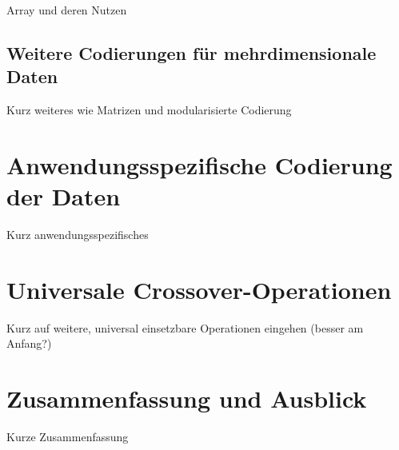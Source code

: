 \documentclass{llncs}
\begin{document}
		Array und deren Nutzen
	
	\subsection{Weitere Codierungen für mehrdimensionale Daten}
	\label{sec:WeitereMehrdimensionale}
	
		Kurz weiteres wie Matrizen und modularisierte Codierung

\section{Anwendungsspezifische Codierung der Daten}
\label{sec:AnwendungsspezifischeCod}

	Kurz anwendungsspezifisches

\section{Universale Crossover-Operationen}
\label{sec:UniversaleOp}

	Kurz auf weitere, universal einsetzbare Operationen eingehen (besser am Anfang?)

\section{Zusammenfassung und Ausblick}
\label{sec:Zusammenfassung}

	Kurze Zusammenfassung

 






\newpage
\end{document}
